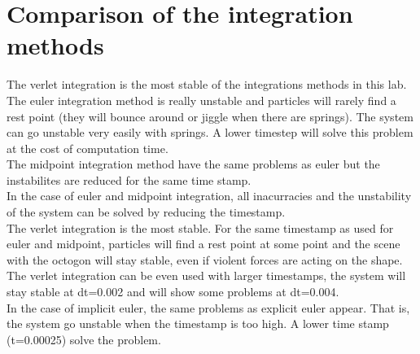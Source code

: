 \documentclass[10pt,a4paper]{report}
\begin{document}
\section*{Comparison of the integration methods}
The verlet integration is the most stable of the integrations methods in this lab.\\
The euler integration method is really unstable and particles will rarely find a rest point (they will bounce around or jiggle when there are springs). The system can go unstable very easily with springs. A lower timestep will solve this problem at the cost of computation time.\\
The midpoint integration method have the same problems as euler but the instabilites are reduced for the same time stamp.\\
In the case of euler and midpoint integration, all inacurracies and the unstability of the system can be solved by reducing the timestamp.\\
The verlet integration is the most stable. For the same timestamp as used for euler and midpoint, particles will find a rest point at some point and the scene with the octogon will stay stable, even if violent forces are acting on the shape. The verlet integration can be even used with larger timestamps, the system will stay stable at dt=0.002 and will show some problems at dt=0.004.\\
In the case of implicit euler, the same problems as explicit euler appear. That is, the system go unstable when the timestamp is too high. A lower time stamp (t=0.00025) solve the problem.
\end{document}
